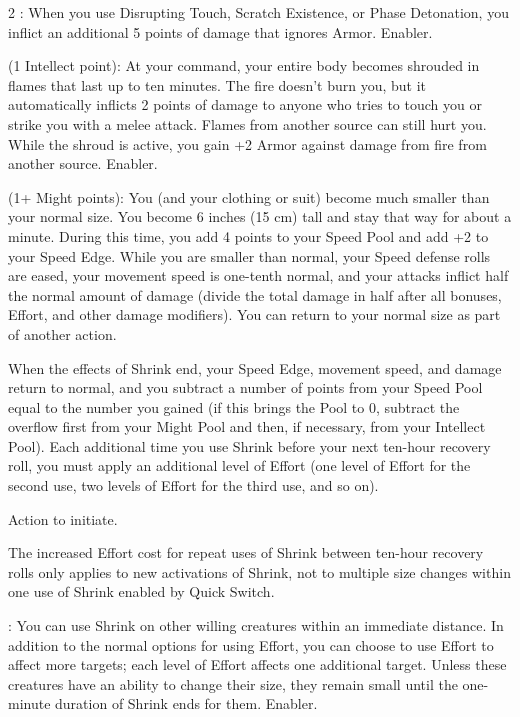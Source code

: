 \begin{multicols}{2}
: When you use Disrupting Touch, Scratch Existence, or Phase Detonation, you inflict an additional 5 points of damage that ignores Armor. Enabler. 
 
 (1 Intellect point): At your command, your entire body becomes shrouded in flames that last up to ten minutes. The fire doesn’t burn you, but it automatically inflicts 2 points of damage to anyone who tries to touch you or strike you with a melee attack. Flames from another source can still hurt you. While the shroud is active, you gain +2 Armor against damage from fire from another source. Enabler. 

 (1+ Might points): You (and your clothing or suit) become much smaller than your normal size. You become 6 inches (15 cm) tall and stay that way for about a minute. During this time, you add 4 points to your Speed Pool and add +2 to your Speed Edge. While you are smaller than normal, your Speed defense rolls are eased, your movement speed is one-tenth normal, and your attacks inflict half the normal amount of damage (divide the total damage in half after all bonuses, Effort, and other damage modifiers). You can return to your normal size as part of another action.

When the effects of Shrink end, your Speed Edge, movement speed, and damage return to normal, and you subtract a number of points from your Speed Pool equal to the number you gained (if this brings the Pool to 0, subtract the overflow first from your Might Pool and then, if necessary, from your Intellect Pool). Each additional time you use Shrink before your next ten-hour recovery roll, you must apply an additional level of Effort (one level of Effort for the second use, two levels of Effort for the third use, and so on).

Action to initiate.

The increased Effort cost for repeat uses of Shrink between ten-hour recovery rolls only applies to new activations of Shrink, not to multiple size changes within one use of Shrink enabled by Quick Switch.

: You can use Shrink on other willing creatures within an immediate distance. In addition to the normal options for using Effort, you can choose to use Effort to affect more targets; each level of Effort affects one additional target. Unless these creatures have an ability to change their size, they remain small until the one-minute duration of Shrink ends for them. Enabler.


\end{multicols}
